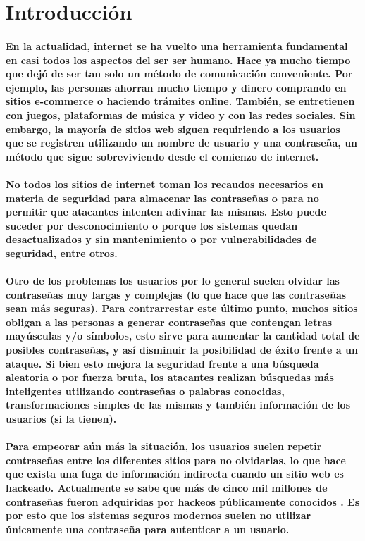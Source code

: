 \documentclass{article}
\begin{document}
\section{Introducción}
\paragraph{
En la actualidad, internet se ha vuelto una herramienta fundamental en casi todos los aspectos del ser ser humano. Hace ya mucho tiempo que dejó de ser tan solo un método de comunicación conveniente. Por ejemplo, las personas ahorran mucho tiempo y dinero comprando en sitios e-commerce o haciendo trámites online. También, se entretienen con juegos, plataformas de música y video y con las redes sociales. Sin embargo, la mayoría de sitios web siguen requiriendo a los usuarios que se registren utilizando un nombre de usuario y una contraseña, un método que sigue sobreviviendo desde el comienzo de internet.
}
\paragraph{
 No todos los sitios de internet toman los recaudos necesarios en materia de seguridad para almacenar las contraseñas o para no permitir que atacantes intenten adivinar las mismas. Esto puede suceder por desconocimiento o porque los sistemas quedan desactualizados y sin mantenimiento o por vulnerabilidades de seguridad, entre otros.
}
\paragraph{
Otro de los problemas los usuarios por lo general suelen olvidar las contraseñas muy largas y complejas (lo que hace que las contraseñas sean más seguras). Para contrarrestar este último punto, muchos sitios obligan a las personas a generar contraseñas que contengan letras mayúsculas y/o símbolos, esto sirve para aumentar la cantidad total de posibles contraseñas, y así disminuir la posibilidad de éxito frente a un ataque. Si bien esto mejora la seguridad frente a una búsqueda aleatoria o por fuerza bruta, los atacantes realizan búsquedas más inteligentes utilizando contraseñas o palabras conocidas, transformaciones simples de las mismas y también información de los usuarios (si la tienen).
}
\paragraph{
Para empeorar aún más la situación, los usuarios suelen repetir contraseñas entre los diferentes sitios para no olvidarlas, lo que hace que exista una fuga de información indirecta cuando un sitio web es hackeado. Actualmente se sabe que más de cinco mil millones de contraseñas fueron adquiridas por hackeos públicamente conocidos \cite{haveibeenpwned}. Es por esto que los sistemas seguros modernos suelen no utilizar únicamente una contraseña para autenticar a un usuario.
}
\end{document}
